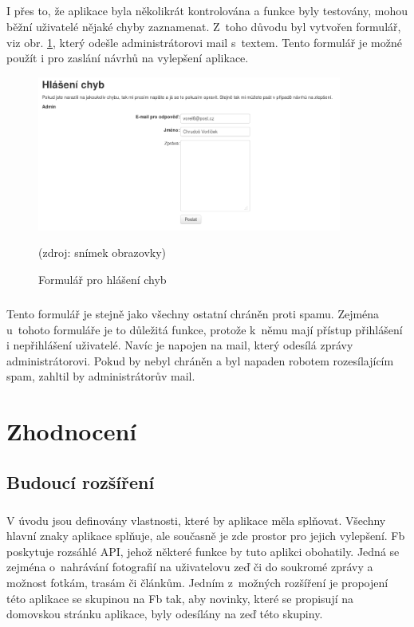 \documentclass[11pt,a4paper,titlepage,oneside]{book}
\begin{document}
		\paragraph{}I přes to, že aplikace byla několikrát kontrolována a funkce byly testovány, mohou běžní uživatelé  nějaké chyby zaznamenat. Z~toho důvodu byl vytvořen formulář, viz obr. \ref{fig:error}, který odešle administrátorovi mail s~textem. Tento formulář je možné použít i pro zaslání návrhů na vylepšení aplikace. 
		\begin{figure}[!h]
			\begin{center}
				\includegraphics[width=10cm]{obrazky/toulavej/error.png}
				\caption{Formulář pro hlášení chyb}
				\label{fig:error}
				(zdroj: snímek obrazovky)
			\end{center}
		\end{figure}	
		\paragraph{}Tento formulář je stejně jako všechny ostatní chráněn proti spamu. Ze\-jména u~tohoto formuláře je to důležitá funkce, protože k~němu mají přístup přihlášení i nepřihlášení uživatelé. Navíc je napojen na mail, který odesílá zprávy administrátorovi. Pokud by nebyl chráněn a byl napaden robotem rozesílajícím spam, zahltil by administrátorův mail.

		

	\chapter{Zhodnocení}
		\section{Budoucí rozšíření}
			\label{sec:budoucnost}
			\paragraph{}V úvodu jsou definovány vlastnosti, které by aplikace měla splňovat. Všechny hlavní znaky aplikace splňuje, ale současně je zde prostor pro jejich vylepšení. \ac{Fb} poskytuje rozsáhlé \ac{API}, jehož některé funkce by tuto aplikci obohatily. Jedná se zejména o~nahrávání fotografií na uživatelovu zeď či do soukromé zprávy a možnost  fotkám, trasám či článkům. Jedním z~možných rozšíření je propojení této aplikace se skupinou na \ac{Fb} tak, aby novinky, které se propisují na domovskou stránku aplikace, byly odesílány na zeď této skupiny.
\end{document}
